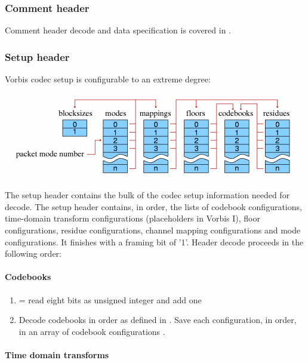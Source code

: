 \subsubsection{Comment header}
Comment header decode and data specification is covered in
.


\subsubsection{Setup header}

Vorbis codec setup is configurable to an extreme degree:

\begin{center}
\includegraphics[width=\textwidth]{components}
\end{center}


The setup header contains the bulk of the codec setup information
needed for decode.  The setup header contains, in order, the lists of
codebook configurations, time-domain transform configurations
(placeholders in Vorbis I), floor configurations, residue
configurations, channel mapping configurations and mode
configurations. It finishes with a framing bit of '1'.  Header decode
proceeds in the following order:

\paragraph{Codebooks}

\begin{enumerate}
\item {} = read eight bits as unsigned integer and add one
\item Decode  codebooks in order as defined
in .  Save each configuration, in
order, in an array of
codebook configurations .
\end{enumerate}



\paragraph{Time domain transforms}

